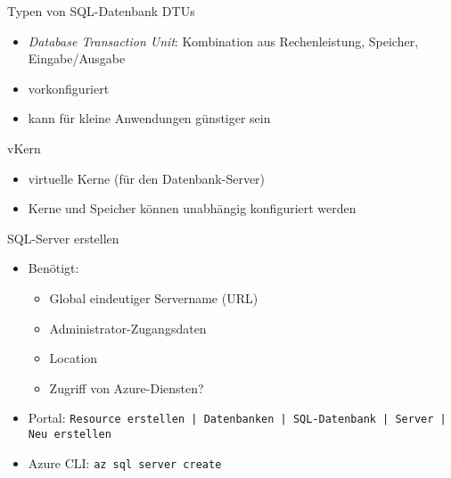 \begin{flashcard}[Definition]{Typen von SQL-Datenbank}
    DTUs
    \begin{itemize}
        \item \emph{Database Transaction Unit}:\newline
            Kombination aus Rechenleistung, Speicher, Eingabe/Ausgabe
        \item vorkonfiguriert
        \item kann für kleine Anwendungen günstiger sein
    \end{itemize}
    vKern
    \begin{itemize}
        \item virtuelle Kerne (für den Datenbank-Server)
        \item Kerne und Speicher können unabhängig konfiguriert werden
    \end{itemize}

\end{flashcard}

\begin{flashcard}[Definition]{SQL-Server erstellen}
    \begin{itemize}
        \item Benötigt:
            \begin{itemize}
                \item Global eindeutiger Servername (URL)
                \item Administrator-Zugangsdaten
                \item Location
                \item Zugriff von Azure-Diensten?
            \end{itemize}
        \item Portal: \texttt{Resource erstellen | Datenbanken | SQL-Datenbank | Server | Neu erstellen }
        \item Azure CLI: \newline
            \texttt{az sql server create}
    \end{itemize}
\end{flashcard}

